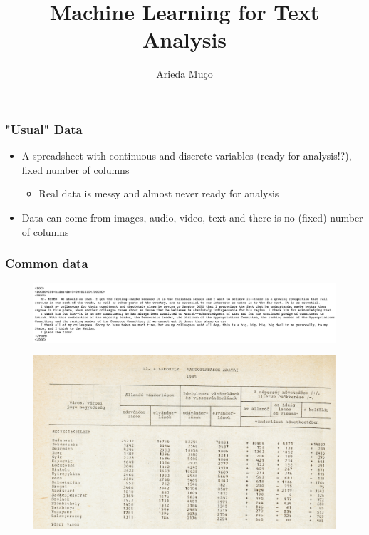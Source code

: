 \documentclass[compress, aspectratio=54]{beamer}
\title[Intro to Text Analysis]{Machine Learning for Text Analysis}
\author[Arieda Mu\c co]{Arieda Mu\c co}
\institute[CEU]{Central European University}
\begin{document}
\captionsetup[subfigure]{labelformat=empty}

\frame{\titlepage}

\begin{frame}
\frametitle{"Usual" Data}
\begin{itemize}
\item A spreadsheet with continuous and discrete variables (ready for analysis!?), fixed number of columns
\begin{itemize}
\item Real data is messy and almost never ready for analysis
\end{itemize}

\item Data can come from images, audio, video, text and there is no (fixed) number of columns

\end{itemize}
\end{frame}

\begin{frame}
\frametitle{Common data}
\begin{figure}

\includegraphics[width=1\linewidth ]{Figures/biden}
\end{figure}
\begin{figure}

\includegraphics[width=0.8\linewidth ]{Figures/ksh-data}
\end{figure}
\end{frame}
\end{document}
